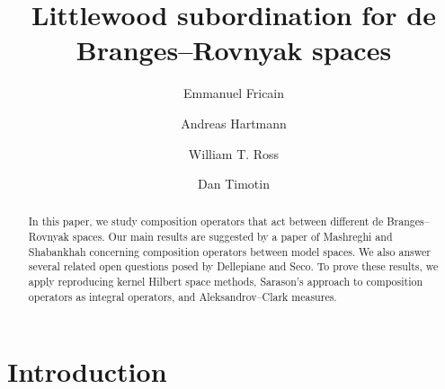 \documentclass[11pt]{amsart}
\title[Littlewood in de Branges--Rovnyak spaces]{Littlewood subordination for de Branges--Rovnyak spaces}
\author[Fricain]{Emmanuel Fricain}
\author[Hartmann]{Andreas Hartmann}
\author[Ross]{William T. Ross}
\author[Timotin]{Dan Timotin}
\def\D{\mathbb{D}}
\def\HH{{\mathcal H}}
\numberwithin{equation}{section}
\theoremstyle{plain}
\theoremstyle{definition}
\begin{document}
\begin{abstract}
In this paper, we study composition operators that act between different de Branges–Rovnyak spaces. Our main results are suggested by a paper of Mashreghi and Shabankhah concerning composition operators between model spaces. We also answer several related open questions posed by Dellepiane and Seco. To prove these results, we apply reproducing kernel Hilbert space methods, Sarason’s approach to composition operators as integral operators, and Aleksandrov–Clark measures.
\end{abstract}
	
	
\maketitle	

\section{Introduction}
\end{document}
